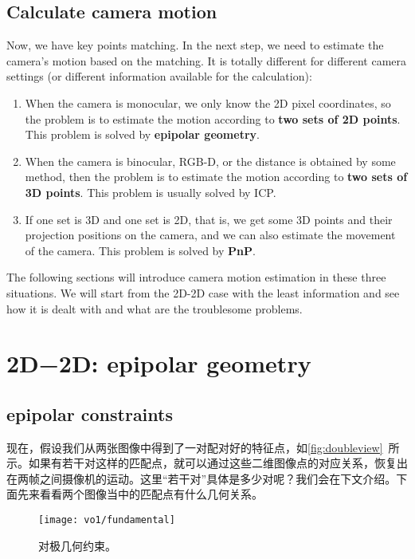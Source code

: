 \subsection{Calculate camera motion}
Now, we have key points matching. In the next step, we need to estimate the camera's motion based on the matching. It is totally different for different camera settings (or different information available for the calculation):

\begin{enumerate}
	\item When the camera is monocular, we only know the 2D pixel coordinates, so the problem is to estimate the motion according to \textbf{two sets of 2D points}. This problem is solved by \textbf{epipolar geometry}.
	\item When the camera is binocular, RGB-D, or the distance is obtained by some method, then the problem is to estimate the motion according to \textbf{two sets of 3D points}. This problem is usually solved by ICP.
	\item If one set is 3D and one set is 2D, that is, we get some 3D points and their projection positions on the camera, and we can also estimate the movement of the camera. This problem is solved by \textbf{PnP}.
\end{enumerate}

The following sections will introduce camera motion estimation in these three situations. We will start from the 2D-2D case with the least information and see how it is dealt with and what are the troublesome problems.

\section{2D−2D: epipolar geometry}
\label{sec:epipolar-geometry}

\subsection{epipolar constraints}

现在，假设我们从两张图像中得到了一对配对好的特征点，如\autoref{fig:doubleview}~所示。如果有若干对这样的匹配点，就可以通过这些二维图像点的对应关系，恢复出在两帧之间摄像机的运动。这里“若干对”具体是多少对呢？我们会在下文介绍。下面先来看看两个图像当中的匹配点有什么几何关系。

\begin{figure}[!htp]
	\centering
	\texttt{[image: vo1/fundamental]}
	\caption{对极几何约束。}
	\label{fig:doubleview}
\end{figure}

